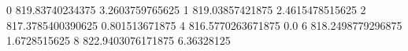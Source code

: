 0 819.83740234375 3.2603759765625
1 819.03857421875 2.4615478515625
2 817.3785400390625 0.801513671875
4 816.5770263671875 0.0
6 818.2498779296875 1.6728515625
8 822.9403076171875 6.36328125
